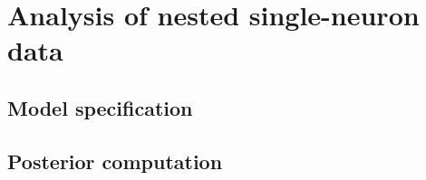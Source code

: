 \chapter{Analysis of nested single-neuron data}

\fancyhead[RO,LE]{\thepage}

\setlength{\parskip}{0.5pt}

\bigskip

\section{Model specification} 

\section{Posterior computation}
